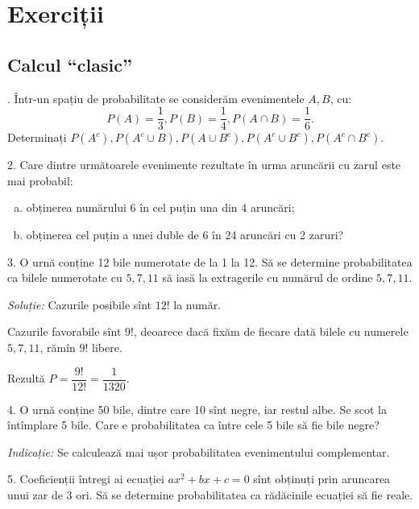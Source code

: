 \documentclass[12pt,a4paper]{article}
\newcommand\qq{\enquote}
\theoremstyle{dotless}
\theoremstyle{dotlessdr}
\begin{document}
\section*{Exerciții}

\subsection*{Calcul \qq{clasic}}

\indent{}. Într-un spațiu de probabilitate se considerăm evenimentele $ A, B $,
cu:
\[
  P(A) = \frac{1}{3}, P(B) = \frac{1}{4}, P(A \cap B) = \frac{1}{6}.
\]
Determinați $ P(A^c), P(A^c \cup B), P(A \cup B^c), P(A^c \cup B^c), P(A^c \cap B^c) $.

\vspace{1cm}

2. Care dintre următoarele evenimente rezultate în urma aruncării cu zarul este mai
probabil:
\begin{enumerate}[(a)]
\item obținerea numărului 6 în cel puțin una din 4 aruncări;
\item obținerea cel puțin a unei duble de 6 în 24 aruncări cu 2 zaruri?
\end{enumerate}

\vspace{1cm}

3. O urnă conține 12 bile numerotate de la 1 la 12. Să se determine probabilitatea
ca bilele numerotate cu $ 5, 7, 11 $ să iasă la extragerile cu numărul de ordine
$ 5, 7, 11 $.

\emph{Soluție:} Cazurile posibile sînt $ 12! $ la număr.

Cazurile favorabile sînt $ 9! $, deoarece dacă fixăm de fiecare dată bilele cu numerele
$ 5, 7, 11 $, rămîn $ 9! $ libere.

Rezultă $ P = \dfrac{9!}{12!} = \dfrac{1}{1320} $.

\vspace{1cm}

4. O urnă conține 50 bile, dintre care 10 sînt negre, iar restul albe. Se scot la întîmplare
5 bile. Care e probabilitatea ca între cele 5 bile să fie bile negre?

\emph{Indicație:} Se calculează mai ușor probabilitatea evenimentului complementar.

\vspace{1cm}

5. Coeficienții întregi ai ecuației $ ax^2 + bx + c = 0 $ sînt obținuți prin aruncarea
unui zar de 3 ori. Să se determine probabilitatea ca rădăcinile ecuației să fie reale.
\end{document}
